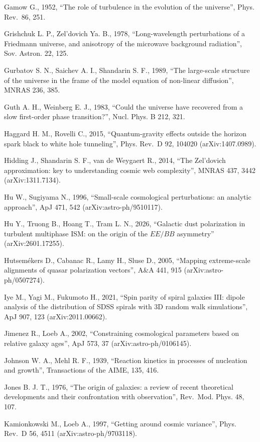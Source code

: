 \documentclass[
  11pt,
]{article}
\begin{document}
Gamow G., 1952, ``The role of turbulence in the evolution of the
universe'', Phys. Rev.~86, 251.

Grishchuk L. P., Zel'dovich Ya. B., 1978, ``Long-wavelength
perturbations of a Friedmann universe, and anisotropy of the microwave
background radiation'', Sov. Astron. 22, 125.

Gurbatov S. N., Saichev A. I., Shandarin S. F., 1989, ``The large-scale
structure of the universe in the frame of the model equation of
non-linear diffusion'', MNRAS 236, 385.

Guth A. H., Weinberg E. J., 1983, ``Could the universe have recovered
from a slow first-order phase transition?'', Nucl. Phys. B 212, 321.

Haggard H. M., Rovelli C., 2015, ``Quantum-gravity effects outside the
horizon spark black to white hole tunneling'', Phys. Rev.~D 92, 104020
(arXiv:1407.0989).

Hidding J., Shandarin S. F., van de Weygaert R., 2014, ``The Zel'dovich
approximation: key to understanding cosmic web complexity'', MNRAS 437,
3442 (arXiv:1311.7134).

Hu W., Sugiyama N., 1996, ``Small-scale cosmological perturbations: an
analytic approach'', ApJ 471, 542 (arXiv:astro-ph/9510117).

Hu Y., Truong B., Hoang T., Tram L. N., 2026, ``Galactic dust
polarization in turbulent multiphase ISM: on the origin of the \(EE/BB\)
asymmetry'' (arXiv:2601.17255).

Hutsemékers D., Cabanac R., Lamy H., Sluse D., 2005, ``Mapping
extreme-scale alignments of quasar polarization vectors'', A\&A 441, 915
(arXiv:astro-ph/0507274).

Iye M., Yagi M., Fukumoto H., 2021, ``Spin parity of spiral galaxies
III: dipole analysis of the distribution of SDSS spirals with 3D random
walk simulations'', ApJ 907, 123 (arXiv:2011.00662).

Jimenez R., Loeb A., 2002, ``Constraining cosmological parameters based
on relative galaxy ages'', ApJ 573, 37 (arXiv:astro-ph/0106145).

Johnson W. A., Mehl R. F., 1939, ``Reaction kinetics in processes of
nucleation and growth'', Transactions of the AIME, 135, 416.

Jones B. J. T., 1976, ``The origin of galaxies: a review of recent
theoretical developments and their confrontation with observation'',
Rev.~Mod. Phys. 48, 107.

Kamionkowski M., Loeb A., 1997, ``Getting around cosmic variance'',
Phys. Rev.~D 56, 4511 (arXiv:astro-ph/9703118).
\end{document}
